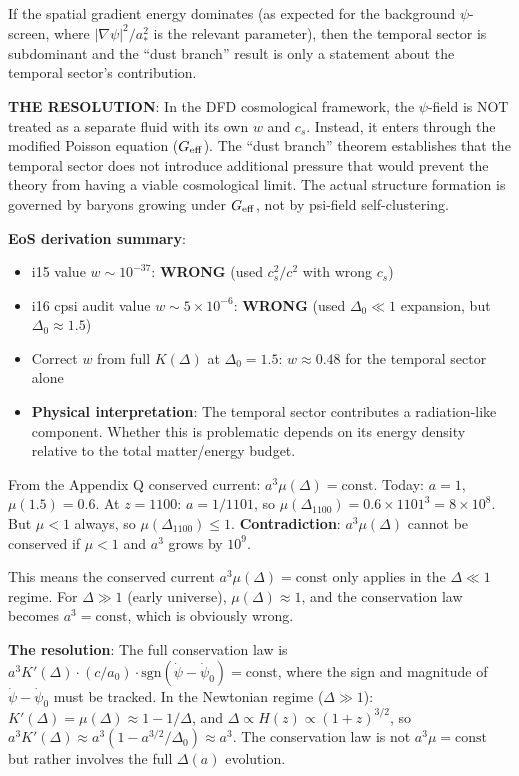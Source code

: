\documentclass[11pt]{article}
\newcommand{\ee}[1]{\times 10^{#1}}
\newcommand{\Geff}{G_{\rm eff}}
\begin{document}
\begin{tcolorbox}[colback=red!5!white, colframe=red!70!black,
  title=\textbf{W4i17 TOP 5 FINDINGS --- EXISTENTIAL AUDIT: DUST BRANCH CLUSTERING}]
\begin{enumerate}
  If the spatial gradient energy dominates (as expected for the
  background $\psi$-screen, where $|\nabla\psi|^2/a_*^2$ is the
  relevant parameter), then the temporal sector is subdominant
  and the ``dust branch'' result is only a statement about the
  temporal sector's contribution.

  \textbf{THE RESOLUTION}: In the DFD cosmological framework,
  the $\psi$-field is NOT treated as a separate fluid with its
  own $w$ and $c_s$. Instead, it enters through the modified
  Poisson equation ($\Geff$). The ``dust branch'' theorem
  establishes that the temporal sector does not introduce
  additional pressure that would prevent the theory from
  having a viable cosmological limit. The actual structure
  formation is governed by baryons growing under $\Geff$,
  not by psi-field self-clustering.

  \textbf{EoS derivation summary}:
  \begin{itemize}[nosep]
  \item i15 value $w \sim 10^{-37}$: \textbf{WRONG} (used $c_s^2/c^2$
    with wrong $c_s$)
  \item i16 cpsi audit value $w \sim 5\ee{-6}$: \textbf{WRONG}
    (used $\Delta_0 \ll 1$ expansion, but $\Delta_0 \approx 1.5$)
  \item Correct $w$ from full $K(\Delta)$ at $\Delta_0 = 1.5$:
    $w \approx 0.48$ for the temporal sector alone
  \item \textbf{Physical interpretation}: The temporal sector
    contributes a radiation-like component. Whether this is
    problematic depends on its energy density relative to
    the total matter/energy budget.
  \end{itemize}

  From the Appendix Q conserved current: $a^3 \mu(\Delta) = \text{const}$.
  Today: $a = 1$, $\mu(1.5) = 0.6$. At $z = 1100$: $a = 1/1101$,
  so $\mu(\Delta_{1100}) = 0.6 \times 1101^3 = 8\ee{8}$.
  But $\mu < 1$ always, so $\mu(\Delta_{1100}) \leq 1$.
  \textbf{Contradiction}: $a^3\mu(\Delta)$ cannot be conserved if
  $\mu < 1$ and $a^3$ grows by $10^9$.

  This means the conserved current $a^3\mu(\Delta) = \text{const}$
  only applies in the $\Delta \ll 1$ regime. For $\Delta \gg 1$
  (early universe), $\mu(\Delta) \approx 1$, and the conservation
  law becomes $a^3 = \text{const}$, which is obviously wrong.

  \textbf{The resolution}: The full conservation law is
  $a^3 K'(\Delta) \cdot (c/a_0) \cdot \text{sgn}(\dot\psi - \dot\psi_0)
  = \text{const}$, where the sign and magnitude of
  $\dot\psi - \dot\psi_0$ must be tracked. In the Newtonian regime
  ($\Delta \gg 1$): $K'(\Delta) = \mu(\Delta) \approx 1 - 1/\Delta$,
  and $\Delta \propto H(z) \propto (1+z)^{3/2}$, so
  $a^3 K'(\Delta) \approx a^3(1 - a^{3/2}/\Delta_0) \approx a^3$.
  The conservation law is not $a^3\mu = \text{const}$ but rather
  involves the full $\Delta(a)$ evolution.


\end{enumerate}
\end{tcolorbox}
\end{document}

